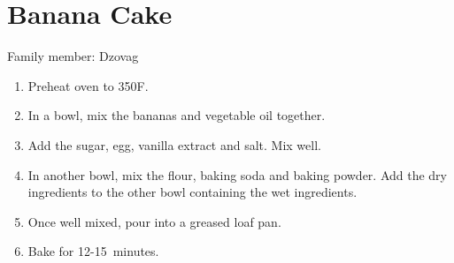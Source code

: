 \chapter{Banana Cake}
\label{ch:bananacake}


Family member: Dzovag


\begin{enumerate}
    \item Preheat oven to 350\degree F.
    \item In a bowl, mix the bananas and vegetable oil together.
    \item Add the sugar, egg, vanilla extract and salt. Mix well.
    \item In another bowl, mix the flour, baking soda and baking powder. Add the dry ingredients to the other bowl containing the wet ingredients.
    \item Once well mixed, pour into a greased loaf pan.
    \item Bake for 12-15~minutes.
\end{enumerate}
